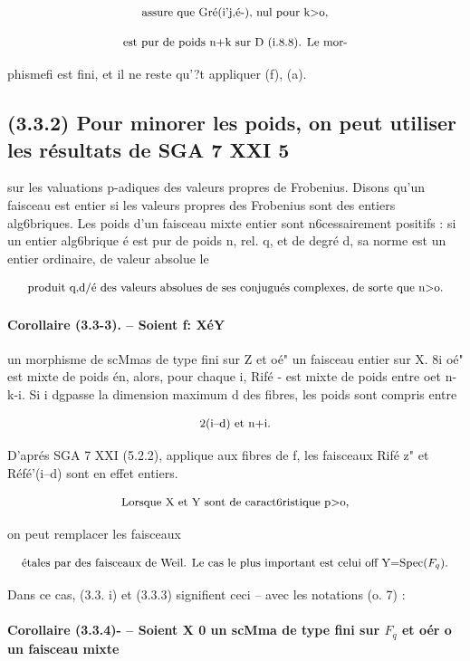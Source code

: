 \documentclass[11pt]{article}
\theoremstyle{remark}
\begin{document}
\[\text{\small assure que Gré(i'j,é-), nul pour k>o,}\]

\[\text{\small est pur de poids n+k sur D (i.8.8). Le mor-}\]

phismefi est fini, et il ne reste qu'?t appliquer (f), (a).

\subsection*{(3.3.2) Pour minorer les poids, on peut utiliser les résultats de SGA 7 XXI 5}

sur les valuations p-adiques des valeurs propres de Frobenius. Disons qu'un faisceau est entier si les valeurs propres des Frobenius sont des entiers alg6briques. Les poids d'un faisceau mixte entier sont n6cessairement positifs : si un entier alg6brique é est pur de poids n, rel. q, et de degré d, sa norme est un entier ordinaire, de valeur absolue le

\[\text{\small produit q,d/é des valeurs absolues de ses conjugués complexes, de sorte que n>o.}\]

\paragraph{Corollaire (3.3-3). -- Soient f: XéY}

un morphisme de scMmas de type fini sur Z et oé" un faisceau entier sur X. 8i oé" est mixte de poids én, alors, pour chaque i, Rifé - est mixte de poids entre oet n-k-i. Si i dgpasse la dimension maximum d des fibres, les poids sont compris entre

\[\text{\small 2(i--d) et n+i.}\]

D'aprés SGA 7 XXI (5.2.2), applique aux fibres de f, les faisceaux Rifé z" et Réfé'(i--d) sont en effet entiers.

\[\text{\small Lorsque X et Y sont de caract6ristique p>o,}\]

on peut remplacer les faisceaux

\[\text{\small étales par des faisceaux de Weil. Le cas le plus important est celui off Y=Spec(\(F_q\)).}\]

Dans ce cas, (3.3. i) et (3.3.3) signifient ceci -- avec les notations (o. 7) :

\paragraph{Corollaire (3.3.4)- -- Soient X 0 un scMma de type fini sur \(F_q\) et oér o un faisceau mixte}
\end{document}
